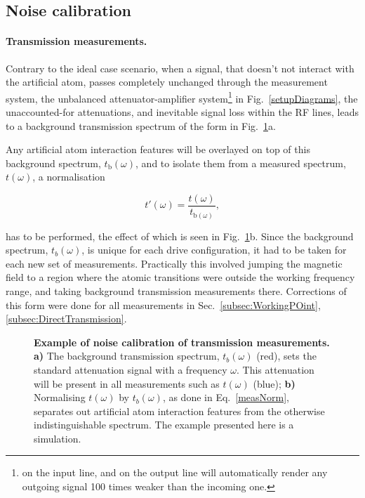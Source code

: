  \subsection{Noise calibration\label{subsec:Noise}}
  \paragraph{Transmission measurements.} Contrary to the ideal case scenario, when a signal, that doesn't not interact with the artificial atom, passes completely unchanged through the measurement system, the unbalanced attenuator-amplifier system\footnote{ on the input line, and  on the output line will automatically render any outgoing signal 100 times weaker than the incoming one.} in Fig.~\ref{setupDiagrams}, the unaccounted-for attenuations, and inevitable signal loss within the RF lines, leads to a background transmission spectrum of the form in Fig.~\ref{measNoise}a.
  
  Any artificial atom interaction features will be overlayed on top of this background spectrum, $ t_{\text{b}}(\omega) $, and to isolate them from a measured spectrum, $ t(\omega) $, a normalisation
  
  \begin{equation}\label{measNorm}
  	t'(\omega) = \frac{t(\omega)}{t_{\text{b}(\omega)}},
  \end{equation}
  
  \noindent has to be performed, the effect of which is seen in Fig.~\ref{measNoise}b. Since the background spectrum, $ t_{b}(\omega) $, is unique for each drive configuration, it had to be taken for each new set of measurements. Practically this involved jumping the magnetic field to a region where the atomic transitions were outside the working frequency range, and taking background transmission measurements there. Corrections of this form were done for all measurements in Sec.~\ref{subsec:WorkingPOint}, \ref{subsec:DirectTransmission}.
  
  \begin{figure}
  	\caption{\small\textbf{Example of noise calibration of transmission measurements.} \textbf{a)} The background transmission spectrum, $ t_{b}(\omega) $ (red), sets the standard attenuation signal with a frequency $ \omega $. This attenuation will be present in all measurements such as $ t(\omega) $ (blue); \textbf{b)} Normalising $ t(\omega) $ by $ t_{b}(\omega) $, as done in Eq.~\eqref{measNorm}, separates out artificial atom interaction features from the otherwise indistinguishable spectrum. The example presented here is a simulation.}
  	\label{measNoise}
  \end{figure}

